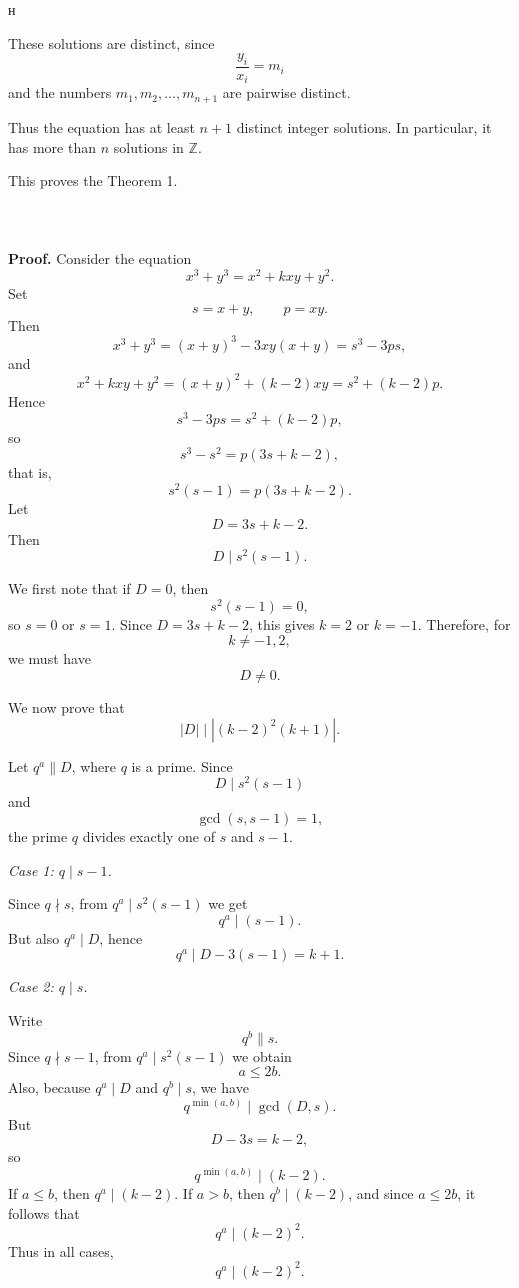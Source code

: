 н\documentclass[a4paper,14pt]{extarticle}  %
\begin{document}
These solutions are distinct, since
\[
\frac{y_i}{x_i}=m_i
\]
and the numbers \(m_1,m_2,\dots,m_{n+1}\) are pairwise distinct.

Thus the equation has at least \(n+1\) distinct integer solutions. In particular, it has more than \(n\) solutions in \(\mathbb Z\).

This proves the Theorem 1.
\\
\\
\noindent{}
\\
\\
\textbf{Proof.}
Consider the equation
\[
x^3+y^3=x^2+kxy+y^2.
\]
Set
\[
s=x+y,\qquad p=xy.
\]
Then
\[
x^3+y^3=(x+y)^3-3xy(x+y)=s^3-3ps,
\]
and
\[
x^2+kxy+y^2=(x+y)^2+(k-2)xy=s^2+(k-2)p.
\]
Hence
\[
s^3-3ps=s^2+(k-2)p,
\]
so
\[
s^3-s^2=p(3s+k-2),
\]
that is,
\[
s^2(s-1)=p(3s+k-2).
\]
Let
\[
D=3s+k-2.
\]
Then
\[
D\mid s^2(s-1).
\]

We first note that if \(D=0\), then
\[
s^2(s-1)=0,
\]
so \(s=0\) or \(s=1\). Since \(D=3s+k-2\), this gives \(k=2\) or \(k=-1\). Therefore, for
\[
k\neq -1,2,
\]
we must have
\[
D\neq 0.
\]

We now prove that
\[
|D|\mid |(k-2)^2(k+1)|.
\]

Let \(q^a\parallel D\), where \(q\) is a prime. Since
\[
D\mid s^2(s-1)
\]
and
\[
\gcd(s,s-1)=1,
\]
the prime \(q\) divides exactly one of \(s\) and \(s-1\).

\medskip

\textit{Case 1: \(q\mid s-1\).}

Since \(q\nmid s\), from \(q^a\mid s^2(s-1)\) we get
\[
q^a\mid (s-1).
\]
But also \(q^a\mid D\), hence
\[
q^a\mid D-3(s-1)=k+1.
\]

\medskip

\textit{Case 2: \(q\mid s\).}

Write
\[
q^b\parallel s.
\]
Since \(q\nmid s-1\), from \(q^a\mid s^2(s-1)\) we obtain
\[
a\le 2b.
\]
Also, because \(q^a\mid D\) and \(q^b\mid s\), we have
\[
q^{\min(a,b)}\mid \gcd(D,s).
\]
But
\[
D-3s=k-2,
\]
so
\[
q^{\min(a,b)}\mid (k-2).
\]
If \(a\le b\), then \(q^a\mid (k-2)\). If \(a>b\), then \(q^b\mid (k-2)\), and since \(a\le 2b\), it follows that
\[
q^a\mid (k-2)^2.
\]
Thus in all cases,
\[
q^a\mid (k-2)^2.
\]
\end{document}
